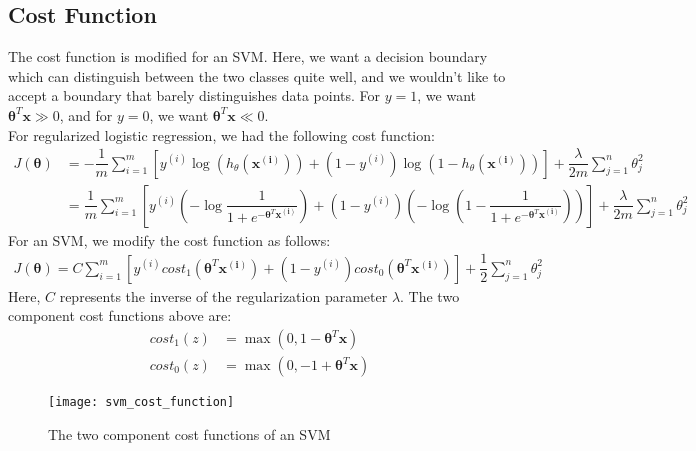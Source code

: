 \documentclass[a4paper, 12pt]{article}
\begin{document}
\subsection{Cost Function}
The cost function is modified for an SVM. Here, we want a decision boundary which can distinguish between the two classes quite well, and we wouldn't like to accept a boundary that barely distinguishes data points. For $y=1$, we want $\bm{\theta}^T\bm{x} \gg 0$, and for $y=0$, we want $\bm{\theta}^T\bm{x} \ll 0$. \\
\break
For regularized logistic regression, we had the following cost function:
\begin{align*}
J\left(\bm{\theta}\right) &= -\dfrac{1}{m}\sum_{i=1}^{m}\left[y^{\left(i\right)}\log\left(h_{\theta}\left(\bm{x^{\left(i\right)}}\right)\right) + \left(1 - y^{\left(i\right)}\right)\log \left(1 - h_{\theta}\left(\bm{x^{\left(i\right)}}\right)\right)\right] + \dfrac{\lambda}{2m}\sum_{j=1}^{n}\theta_j^2 \\
&= \dfrac{1}{m}\sum_{i=1}^{m}\left[y^{\left(i\right)}\left(-\log\dfrac{1}{1+e^{-\bm{\theta}^T\bm{x^{\left(i\right)}}}}\right) + \left(1 - y^{\left(i\right)}\right)\left(-\log\left(1 - \dfrac{1}{1+e^{-\bm{\theta}^T\bm{x^{\left(i\right)}}}}\right)\right)\right] + \dfrac{\lambda}{2m}\sum_{j=1}^{n}\theta_j^2
\end{align*}
For an SVM, we modify the cost function as follows:
\begin{align*}
J\left(\bm{\theta}\right) = C\sum_{i=1}^{m}\left[y^{\left(i\right)}cost_1\left(\bm{\theta}^T\bm{x^{\left(i\right)}}\right) + \left(1 - y^{\left(i\right)}\right)cost_0\left(\bm{\theta}^T\bm{x^{\left(i\right)}}\right)\right] + \dfrac{1}{2}\sum_{j=1}^{n}\theta_j^2
\end{align*}
Here, $C$ represents the inverse of the regularization parameter $\lambda$. The two component cost functions above are:
\begin{align*}
cost_1\left(z\right) &= \max\left(0, 1 - \bm{\theta}^T\bm{x}\right) \\
cost_0\left(z\right) &= \max\left(0, -1 + \bm{\theta}^T\bm{x}\right)
\end{align*}
\begin{figure}[H]
\centering
\texttt{[image: svm\_cost\_function]}
\caption{The two component cost functions of an SVM}
\end{figure}
\end{document}
